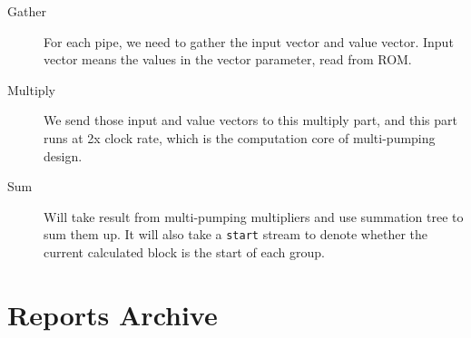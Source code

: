 \documentclass[a4paper, 10pt]{article}
\begin{document}
\begin{description}
\item[Gather] For each pipe, we need to gather the input vector and value vector. Input vector means the values in the vector parameter, read from ROM. 
\item[Multiply] We send those input and value vectors to this multiply part, and this part runs at 2x clock rate, which is the computation core of multi-pumping design.
\item[Sum] Will take result from multi-pumping multipliers and use summation tree to sum them up. It will also take a \texttt{start} stream to denote whether the current calculated block is the start of each group.
\end{description}



\newpage

\section{Reports Archive}
 \newpage
 \newpage
 \newpage
   
\end{document}
